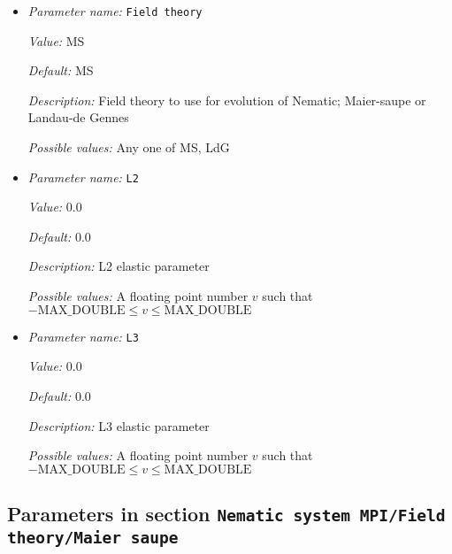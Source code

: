 \begin{itemize}
\item {\it Parameter name:} {\tt Field theory}
\label{parameters:Nematic system MPI/Field theory/Field theory}
\label{parameters:Nematic_20system_20MPI/Field_20theory/Field_20theory}


{\it Value:} MS


{\it Default:} MS


{\it Description:} Field theory to use for evolution of Nematic; Maier-saupe or Landau-de Gennes


{\it Possible values:} Any one of MS, LdG
\item {\it Parameter name:} {\tt L2}
\label{parameters:Nematic system MPI/Field theory/L2}
\label{parameters:Nematic_20system_20MPI/Field_20theory/L2}


{\it Value:} 0.0


{\it Default:} 0.0


{\it Description:} L2 elastic parameter


{\it Possible values:} A floating point number $v$ such that $-\text{MAX\_DOUBLE} \leq v \leq \text{MAX\_DOUBLE}$
\item {\it Parameter name:} {\tt L3}
\label{parameters:Nematic system MPI/Field theory/L3}
\label{parameters:Nematic_20system_20MPI/Field_20theory/L3}


{\it Value:} 0.0


{\it Default:} 0.0


{\it Description:} L3 elastic parameter


{\it Possible values:} A floating point number $v$ such that $-\text{MAX\_DOUBLE} \leq v \leq \text{MAX\_DOUBLE}$
\end{itemize}



\subsection{Parameters in section \tt Nematic system MPI/Field theory/Maier saupe}
\label{parameters:Nematic_20system_20MPI/Field_20theory/Maier_20saupe}

